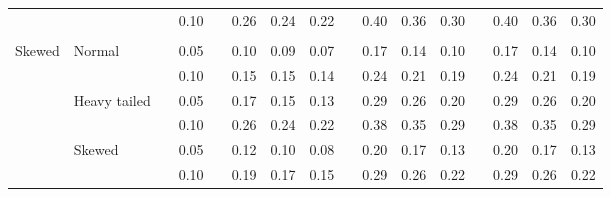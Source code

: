 \documentclass[11pt]{article} %
\begin{document}
\begin{table}[ht]
\begin{scriptsize}
\begin{center}
\begin{tabular}{ll p{.1cm} c p{.1cm} rrr p{.1cm} rrr p{.1cm} rrr}
             &              && 0.10 &&  0.26 & 0.24 & 0.22 && 0.40 & 0.36 & 0.30 && 0.40 & 0.36 & 0.30 \\
             &&&&&&&&&&&&&&&\\ 
Skewed       & Normal       && 0.05 &&  0.10 & 0.09 & 0.07 && 0.17 & 0.14 & 0.10 && 0.17 & 0.14 & 0.10 \\ 
             &              && 0.10 &&  0.15 & 0.15 & 0.14 && 0.24 & 0.21 & 0.19 && 0.24 & 0.21 & 0.19 \\ 
             & Heavy tailed && 0.05 &&  0.17 & 0.15 & 0.13 && 0.29 & 0.26 & 0.20 && 0.29 & 0.26 & 0.20 \\ 
             &              && 0.10 &&  0.26 & 0.24 & 0.22 && 0.38 & 0.35 & 0.29 && 0.38 & 0.35 & 0.29 \\ 
             & Skewed       && 0.05 &&  0.12 & 0.10 & 0.08 && 0.20 & 0.17 & 0.13 && 0.20 & 0.17 & 0.13 \\ 
             &              && 0.10 &&  0.19 & 0.17 & 0.15 && 0.29 & 0.26 & 0.22 && 0.29 & 0.26 & 0.22 \\ 



\end{tabular}
\end{center}
\end{scriptsize}
\end{table}
\end{document}
